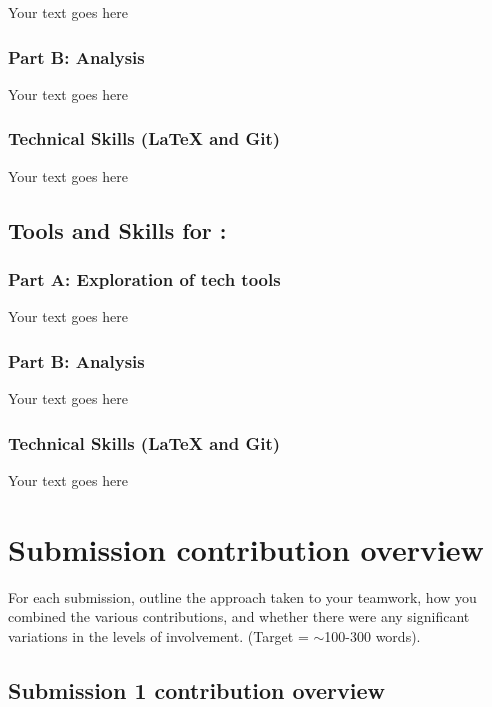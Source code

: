 \documentclass[a4paper, 11pt]{report}
\begin{document}
{{Your text goes here

\subsubsection{Part B: Analysis}

Your text goes here

\subsubsection{Technical Skills (LaTeX and Git)}

Your text goes here



\subsection{Tools and Skills for \majD: \studD}

\subsubsection{Part A: Exploration of tech tools}

Your text goes here

\subsubsection{Part B: Analysis}

Your text goes here

\subsubsection{Technical Skills (LaTeX and Git)}

Your text goes here



\newpage
\section{Submission contribution overview}

For each submission, outline the approach taken to your teamwork, how you combined the various contributions, and whether there were any significant variations in the levels of involvement. (Target = $\sim$100-300 words).

\subsection{Submission 1 contribution overview}

}}
\end{document}

